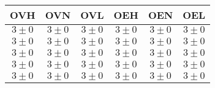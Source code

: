 \begin{tabular}{|c|c|c|c|c|c|}
\hline 
OVH & OVN & OVL & OEH & OEN & OEL\\ 
\hline 
\hline 
$3\pm0$ & $3\pm0$ & $3\pm0$ & $3\pm0$ & $3\pm0$ & $3\pm0$ \\ 
\hline 
$3\pm0$ & $3\pm0$ & $3\pm0$ & $3\pm0$ & $3\pm0$ & $3\pm0$ \\ 
\hline 
$3\pm0$ & $3\pm0$ & $3\pm0$ & $3\pm0$ & $3\pm0$ & $3\pm0$ \\ 
\hline 
$3\pm0$ & $3\pm0$ & $3\pm0$ & $3\pm0$ & $3\pm0$ & $3\pm0$ \\ 
\hline 
$3\pm0$ & $3\pm0$ & $3\pm0$ & $3\pm0$ & $3\pm0$ & $3\pm0$ \\ 
\hline 
\end{tabular}